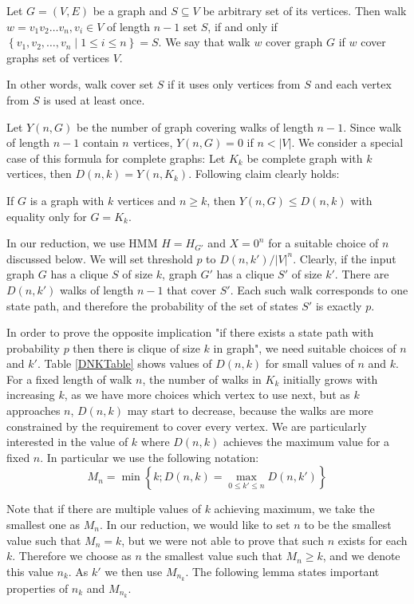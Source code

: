 \begin{definition}
Let $G=(V, E)$ be a graph and $S\subseteq V$ be arbitrary set of its vertices.
Then walk $w=v_1v_2\dots v_n, v_i\in V$ of length $n-1$  set
$S$, if and only if $\left\{v_1, v_2, \dots, v_n\mid 1\leq i\leq n\right\}=S$. 
We say that walk $w$ cover graph $G$ if $w$ cover graphs set of vertices $V$.

In other words, walk cover set $S$ if it uses only vertices from $S$ and each
vertex from $S$ is used at least once.
\end{definition}

Let $Y(n, G)$ be the number of graph covering walks of length $n-1$. Since walk
of length $n - 1$ contain $n$ vertices, $Y(n, G)=0$ if $n<|V|$. We consider a
special case of this formula for complete graphs: Let $K_k$ be
complete graph with $k$ vertices, then $D(n, k) = Y(n, K_k)$. Following claim
clearly holds:

\begin{lemma}\label{NotCliqueIsSmaller}
If $G$ is a graph with $k$ vertices and $n\ge k$, then
$Y(n,G)\le D(n,k)$ with equality only for $G=K_k$. 
\end{lemma}

In our reduction, we use HMM $H=H_{G'}$ and $X=0^n$ for a suitable choice of $n$
discussed below. We will set threshold $p$ to $D(n,k')/|V|^{n}$. Clearly, if the
input graph $G$ has a clique $S$ of size $k$, graph $G'$ has a clique $S'$ of
size $k'$. There are $D(n,k')$ walks of length $n-1$ that cover $S'$. Each such
walk corresponds to one state path, and therefore the probability of the set of
states $S'$ is exactly $p$. 

In order to prove the opposite implication "if there exists a state path with
probability $p$ then there is clique of size $k$ in graph", we need suitable choices
of $n$ and $k'$. Table \ref{DNKTable} shows values of $D(n,k)$ for
small values of $n$ and $k$. For a fixed length of walk $n$, the
number of walks in $K_k$ initially grows with increasing $k$, as we
have more choices which vertex to use next, but as $k$ approaches $n$,
$D(n,k)$  may start to decrease, because the walks are more constrained by
the requirement to cover every vertex. We are particularly interested in
the value of $k$ where $D(n,k)$ achieves the maximum value for a fixed $n$. 
In particular we use the following notation:
$$M_{n} = \min\left\{k ; D(n,k) = \max_{0\leq k'\leq
  n}D(n,k')\right\}$$
  
Note that if there are multiple values
of $k$ achieving maximum, we take the smallest one as $M_n$.  In our
reduction, we would like to set $n$ to be the smallest value such that
$M_n=k$, but we were not able to prove that such $n$ exists for each $k$.
Therefore we choose as $n$ the smallest value such that $M_n\ge k$, and 
we denote this value $n_k$. As $k'$ we then use $M_{n_k}$. The following 
lemma states important properties of $n_k$ and $M_{n_k}$. 

